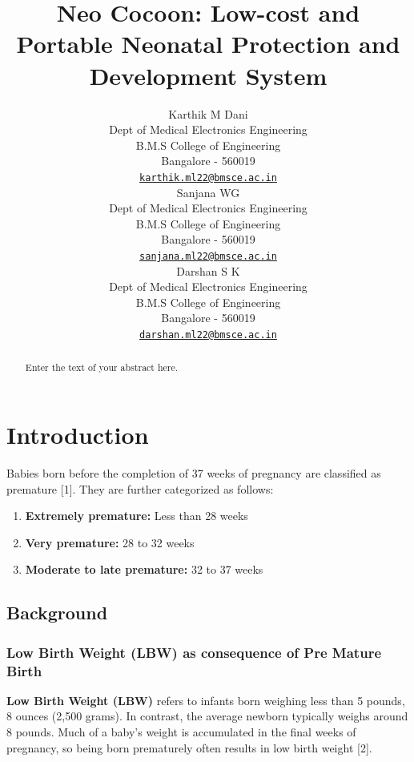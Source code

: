 \documentclass{article}
\title{Neo Cocoon: Low-cost and Portable Neonatal Protection and
Development System}
\author{
    Karthik M Dani
   \\
    Dept of Medical Electronics Engineering \\
    B.M.S College of Engineering \\
  Bangalore - 560019 \\
  \texttt{\href{mailto:karthik.ml22@bmsce.ac.in}{\nolinkurl{karthik.ml22@bmsce.ac.in}}} \\
   \And
    Sanjana WG
   \\
    Dept of Medical Electronics Engineering \\
    B.M.S College of Engineering \\
  Bangalore - 560019 \\
  \texttt{\href{mailto:sanjana.ml22@bmsce.ac.in}{\nolinkurl{sanjana.ml22@bmsce.ac.in}}} \\
   \And
    Darshan S K
   \\
    Dept of Medical Electronics Engineering \\
    B.M.S College of Engineering \\
  Bangalore - 560019 \\
  \texttt{\href{mailto:darshan.ml22@bmsce.ac.in}{\nolinkurl{darshan.ml22@bmsce.ac.in}}} \\
  }
\begin{document}
\maketitle


\begin{abstract}
Enter the text of your abstract here.
\end{abstract}


\section{Introduction}\label{introduction}

Babies born before the completion of 37 weeks of pregnancy are
classified as premature {[}1{]}. They are further categorized as
follows:

\begin{enumerate}
\def\labelenumi{\arabic{enumi}.}
\item
  \textbf{Extremely premature:} Less than 28 weeks
\item
  \textbf{Very premature:} 28 to 32 weeks
\item
  \textbf{Moderate to late premature:} 32 to 37 weeks
\end{enumerate}

\subsection{Background}\label{background}

\subsubsection{Low Birth Weight (LBW) as consequence of Pre Mature
Birth}\label{low-birth-weight-lbw-as-consequence-of-pre-mature-birth}

\textbf{Low Birth Weight (LBW)} refers to infants born weighing less
than 5 pounds, 8 ounces (2,500 grams). In contrast, the average newborn
typically weighs around 8 pounds. Much of a baby's weight is accumulated
in the final weeks of pregnancy, so being born prematurely often results
in low birth weight {[}2{]}.
\end{document}
